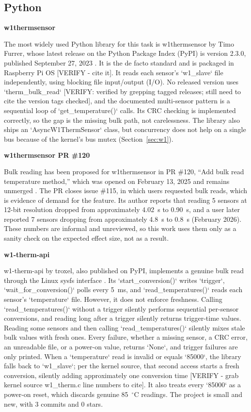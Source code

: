 \documentclass[conference]{IEEEtran}
\begin{document}
\subsection{Python}

\textbf{w1thermsensor}

The most widely used Python library for this task is w1thermsensor by Timo Furrer, whose latest release on the Python Package Index (PyPI) is version 2.3.0, published September 27, 2023 \cite{w1thermsensor}.
It is the de facto standard and is packaged in Raspberry Pi OS [VERIFY - cite it].
It reads each sensor's `w1\_slave` file independently, using blocking file input/output (I/O).
No released version uses `therm\_bulk\_read` [VERIFY: verified by grepping tagged releases; still need to cite the version tags checked], and the documented multi-sensor pattern is a sequential loop of `get\_temperature()` calls.
Its CRC checking is implemented correctly, so the gap is the missing bulk path, not carelessness.
The library also ships an `AsyncW1ThermSensor` class, but concurrency does not help on a single bus because of the kernel's bus mutex (Section~\ref{sec:w1}).

\textbf{w1thermsensor PR \#120}

Bulk reading has been proposed for w1thermsensor in PR \#120, ``Add bulk read temperature method,'' which was opened on February 13, 2025 and remains unmerged \cite{w1thermsensor_pr120}.
The PR closes issue \#115, in which users requested bulk reads, which is evidence of demand for the feature.
Its author reports that reading 5 sensors at 12-bit resolution dropped from approximately 4.02~s to 0.90~s, and a user later reported 7 sensors dropping from approximately 4.8~s to 0.8~s (February 2026).
These numbers are informal and unreviewed, so this work uses them only as a sanity check on the expected effect size, not as a result.

\textbf{w1-therm-api}

w1-therm-api by troxel, also published on PyPI, implements a genuine bulk read through the Linux sysfs interface \cite{w1_therm_api}.
Its `start\_conversion()` writes `trigger`, `wait\_for\_conversion()` polls every 5~ms, and `read\_temperatures()` reads each sensor's `temperature` file.
However, it does not enforce freshness.
Calling `read\_temperatures()` without a trigger silently performs sequential per-sensor conversions, and reading long after a trigger silently returns trigger-time values.
Reading some sensors and then calling `read\_temperatures()` silently mixes stale bulk values with fresh ones.
Every failure, whether a missing sensor, a CRC error, an unreadable file, or a power-on value, returns `None`, and trigger failures are only printed.
When a `temperature` read is invalid or equals `85000`, the library falls back to `w1\_slave`; per the kernel source, that second access starts a fresh conversion, silently adding approximately one conversion time [VERIFY - grab kernel source w1\_therm.c line numbers to cite].
It also treats every `85000` as a power-on reset, which discards genuine 85~$^\circ$C readings.
The project is small and new, with 3 commits and 0 stars.
\end{document}
